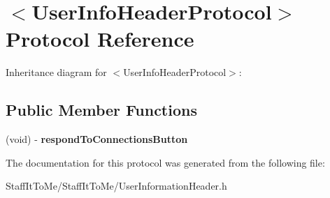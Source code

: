 \hypertarget{protocol_user_info_header_protocol-p}{
\section{$<$\-User\-Info\-Header\-Protocol$>$ \-Protocol \-Reference}
\label{protocol_user_info_header_protocol-p}
}


\-Inheritance diagram for $<$\-User\-Info\-Header\-Protocol$>$\-:
\subsection*{\-Public \-Member \-Functions}
\begin{DoxyCompactItemize}
\item 
\hypertarget{protocol_user_info_header_protocol-p_aa71f3bfee7b0dba3da666a47c40f1165}{
(void) -\/ {\bfseries respond\-To\-Connections\-Button}}
\label{protocol_user_info_header_protocol-p_aa71f3bfee7b0dba3da666a47c40f1165}

\end{DoxyCompactItemize}


\-The documentation for this protocol was generated from the following file\-:\begin{DoxyCompactItemize}
\item 
\-Staff\-It\-To\-Me/\-Staff\-It\-To\-Me/\-User\-Information\-Header.\-h\end{DoxyCompactItemize}
